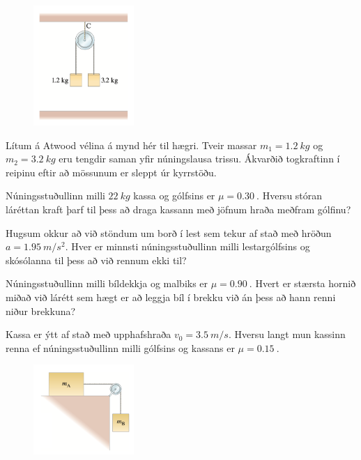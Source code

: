 \ifdefined \wholebook \else\documentclass[oneside]{book}\usepackage{EdlBook}\graphicspath{{figures/}}
\begin{document}
\begin{enumerate}[label = \textbf{Dæmi \thechapter.\arabic*.}]
\begin{minipage}{\linewidth}
\end{minipage}

\vspace{0.3cm}

\begin{minipage}{\linewidth}
\begin{figure}
\vspace{-3.5cm}
\includegraphics[width=1.5in]{images/atwood.png}
\end{figure}

\item Lítum á Atwood vélina á mynd hér til hægri. Tveir massar $m_1 = \SI{1.2}{kg}$ og $m_2 = \SI{3.2}{kg}$ eru tengdir saman yfir núningslausa trissu. Ákvarðið togkraftinn í reipinu eftir að mössunum er sleppt úr kyrrstöðu.

\item Núningsstuðullinn milli $\SI{22}{kg}$ kassa og gólfsins er $\mu = \SI{0.30}{}$. Hversu stóran láréttan kraft þarf til þess að draga kassann með jöfnum hraða meðfram gólfinu?

\end{minipage}

\item Hugsum okkur að við stöndum um borð í lest sem tekur af stað með hröðun $a = \SI{1.95}{m/s^2}$. Hver er minnsti núningsstuðullinn milli lestargólfsins og skósólanna til þess að við rennum ekki til?

\item Núningsstuðullinn milli bíldekkja og malbiks er $\mu = \SI{0.90}{}$. Hvert er stærsta hornið miðað við lárétt sem hægt er að leggja bíl í brekku við án þess að hann renni niður brekkuna?

\item Kassa er ýtt af stað með upphafshraða $v_0 = \SI{3.5}{m/s}$. Hversu langt mun kassinn renna ef núningsstuðullinn milli gólfsins og kassans er $\mu = \SI{0.15}{}$.

\begin{minipage}{\linewidth}
\begin{figure}
\vspace{-0.75cm}
\includegraphics[width=1.5in]{images/trissbert.png}
\end{figure}


\end{minipage}
\end{enumerate}
\end{document}
